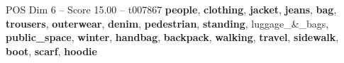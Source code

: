 \begin{textsample}{POS Dim 6 – Score 15.00 – t007867}  \label{ex:f6_pos_033}
\textbf{people}, \textbf{clothing}, \textbf{jacket}, \textbf{jeans}, \textbf{bag}, \textbf{trousers}, \textbf{outerwear}, \textbf{denim}, \textbf{pedestrian}, \textbf{standing}, luggage\_\&\_bags, \textbf{public\_space}, \textbf{winter}, \textbf{handbag}, \textbf{backpack}, \textbf{walking}, \textbf{travel}, \textbf{sidewalk}, \textbf{boot}, \textbf{scarf}, \textbf{hoodie}

\end{textsample}
